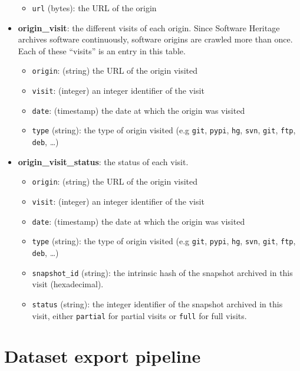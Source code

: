 \begin{itemize}
  \begin{itemize}
  \tightlist
  \item
    \texttt{url} (bytes): the URL of the origin
  \end{itemize}
\item
  \textbf{origin\_visit}: the different visits of each origin. Since
  Software Heritage archives software continuously, software origins are
  crawled more than once. Each of these ``visits'' is an entry in this
  table.

  \begin{itemize}
  \tightlist
  \item
    \texttt{origin}: (string) the URL of the origin visited
  \item
    \texttt{visit}: (integer) an integer identifier of the visit
  \item
    \texttt{date}: (timestamp) the date at which the origin was visited
  \item
    \texttt{type} (string): the type of origin visited (e.g
    \texttt{git}, \texttt{pypi}, \texttt{hg}, \texttt{svn},
    \texttt{git}, \texttt{ftp}, \texttt{deb}, \ldots)
  \end{itemize}
\item
  \textbf{origin\_visit\_status}: the status of each visit.

  \begin{itemize}
  \tightlist
  \item
    \texttt{origin}: (string) the URL of the origin visited
  \item
    \texttt{visit}: (integer) an integer identifier of the visit
  \item
    \texttt{date}: (timestamp) the date at which the origin was visited
  \item
    \texttt{type} (string): the type of origin visited (e.g
    \texttt{git}, \texttt{pypi}, \texttt{hg}, \texttt{svn},
    \texttt{git}, \texttt{ftp}, \texttt{deb}, \ldots)
  \item
    \texttt{snapshot\_id} (string): the intrinsic hash of the snapshot
    archived in this visit (hexadecimal).
  \item
    \texttt{status} (string): the integer identifier of the snapshot
    archived in this visit, either \texttt{partial} for partial visits
    or \texttt{full} for full visits.
  \end{itemize}
\end{itemize}


\section{Dataset export pipeline}

